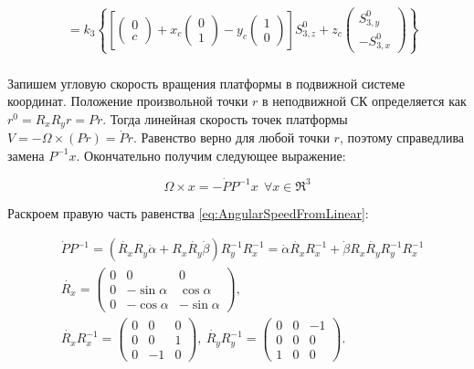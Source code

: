 \begin{equation}
\begin{aligned}
& = k_3\left\{
\left[\begin{pmatrix}0 \\ c\end{pmatrix} +
x_c\begin{pmatrix}0 \\ 1\end{pmatrix} -
y_c\begin{pmatrix}1 \\ 0\end{pmatrix}
\right]S_{3,z}^0+z_c\begin{pmatrix}S_{3,y}^0 \\ -S_{3,x}^0\end{pmatrix}\right\} \\
\end{aligned}
\end{equation}

Запишем угловую скорость вращения платформы в подвижной системе координат. Положение произвольной точки $r$ в неподвижной СК определяется как $r^0 = R_xR_yr = Pr$. Тогда линейная скорость точек платформы $V = -\Omega\times\left(Pr\right) = \dot{P}r$. Равенство верно для любой точки $r$, поэтому справедлива замена $P^{-1}x$. Окончательно получим следующее выражение:

\begin{equation}
\label{eq:AngularSpeedFromLinear}
\Omega \times x = -\dot{P} P^{-1} x ~~\forall x\in\Re^3
\end{equation}

Раскроем правую часть равенства \ref{eq:AngularSpeedFromLinear}:

\begin{equation}
\label{eq:AngularSpeedTurnOperatorDiff}
\begin{aligned}
& \dot{P}P^{-1} = \left(\dot{R_x}R_y\dot{\alpha} + R_x\dot{R_y}\dot{\beta}\right)R_y^{-1}R_x^{-1}=\dot{\alpha}\dot{R_x}R_x^{-1} + \dot{\beta}R_x\dot{R_y}R_y^{-1}R_x^{-1}\\
& \dot{R_x} = \begin{pmatrix}
0 & 0 & 0\\
0 & -\sin{\alpha} & \cos{\alpha}\\
0 & -\cos{\alpha} & -\sin{\alpha}
\end{pmatrix},\\
& \dot{R_x}R_x^{-1} = \begin{pmatrix}
0 & 0 & 0\\
0 & 0 & 1\\
0 & -1 & 0
\end{pmatrix},~
 \dot{R_y}R_y^{-1} = \begin{pmatrix}
0 & 0 & -1\\
0 & 0 & 0\\
1 & 0 & 0
\end{pmatrix}.
\end{aligned}
\end{equation}

